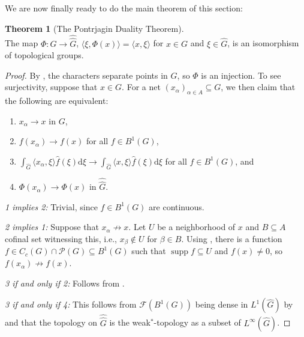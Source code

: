 \documentclass[10pt,twoside,openany,final]{memoir}
\theoremstyle{definition}
\newtheorem{theorem}{Theorem}[chapter]
\theoremstyle{Break}
\newcommand{\F}{\mathcal{F}}
\newcommand{\G}{\widehat{G}}
\renewcommand{\P}{\mathcal{P}}
\DeclareMathOperator{\supp}{supp}
\renewcommand{\d}{\mathrm{d}}
\begin{document}
We are now finally ready to do the main theorem of this section:
\begin{theorem}[The Pontrjagin Duality Theorem]
	\mbox{}\\
	The map $\Phi \colon G \to \widehat{\G}$, $\langle \xi , \Phi(x)\rangle = \langle x , \xi \rangle$ for $x \in G$ and $\xi \in \G$, is an isomorphism of topological groups.
	\label{4.31}
\end{theorem}
\begin{proof}
	By , the characters separate points in $G$, so $\Phi$ is an injection. To see surjectivity, suppose that $x \in G$. For a net $(x_\alpha)_{\alpha \in A} \subseteq G$, we then claim that the following are equivalent:
	\begin{enumerate}
		\item $x_\alpha \to x$ in $G$,
		\item $f(x_\alpha) \to f(x)$ for all $f \in B^1(G)$,
		\item $\int_{\G}\langle x_\alpha, \xi \rangle \widehat{f}(\xi) \d \xi \to \int_{\G}\langle x, \xi \rangle \widehat{f}(\xi)\d \xi$ for all $f \in B^1(G)$, and
		\item $\Phi(x_\alpha) \to \Phi(x)$ in $\widehat{\G}$.
	\end{enumerate}
	\textit{1 implies 2:} Trivial, since $f \in B^1(G)$ are continuous.

	\textit{2 implies 1:} Suppose that $x_\alpha \not\to x$. Let $U$ be a neighborhood of $x$ and $B \subseteq A$ cofinal set witnessing this, i.e.,  $x_{\beta} \not\in U$ for $\beta \in B$.
	Using , there is a function $f \in C_c(G) \cap \P(G) \subseteq B^1(G)$ such that $\supp f \subseteq U$ and $f(x) \neq 0$, so $f(x_\alpha) \not \to f(x)$.

	\textit{3 if and only if 2:} Follows from .

	\textit{3 if and only if 4:} This follows from $\F(B^1(G))$ being dense in $L^1(\G)$ by  and that the topology on $\widehat{\G}$ is the weak$^*$-topology as a subset of $L^\infty(\G)$. 


\end{proof}
\end{document}
